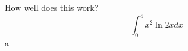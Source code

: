 \documentclass{article}
\begin{document}
How well does this work?
$$\int_0^4 x^2 \ln{2x}dx$$
a
\end{document}
